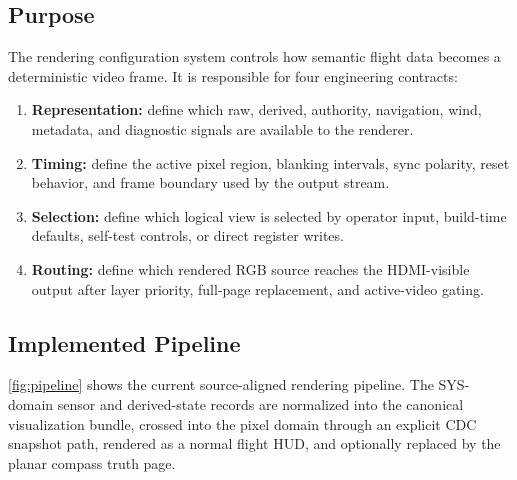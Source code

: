 \documentclass[letterpaper, final, onecolumn, titlepage]{article}
\newcommand{\Cref}[1]{\ref{#1}}
\begin{document}
\subsection{Purpose}

The rendering configuration system controls how semantic flight data becomes a
deterministic video frame. It is responsible for four engineering contracts:

\begin{enumerate}[leftmargin=*]
  \item \textbf{Representation:} define which raw, derived, authority, navigation,
  wind, metadata, and diagnostic signals are available to the renderer.
  \item \textbf{Timing:} define the active pixel region, blanking intervals, sync
  polarity, reset behavior, and frame boundary used by the output stream.
  \item \textbf{Selection:} define which logical view is selected by operator
  input, build-time defaults, self-test controls, or direct register writes.
  \item \textbf{Routing:} define which rendered RGB source reaches the HDMI-visible
  output after layer priority, full-page replacement, and active-video gating.
\end{enumerate}

\subsection{Implemented Pipeline}

\Cref{fig:pipeline} shows the current source-aligned rendering pipeline. The
SYS-domain sensor and derived-state records are normalized into the canonical
visualization bundle, crossed into the pixel domain through an explicit CDC
snapshot path, rendered as a normal flight HUD, and optionally replaced by the
planar compass truth page.
\end{document}
